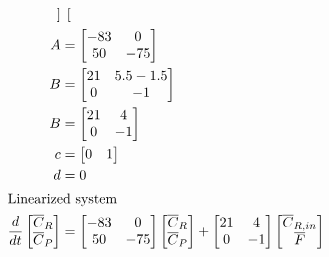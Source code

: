 \documentclass[12pt]{article}
\begin{document}
\begin{enumerate}
\begin{enumerate}
\begin{align*}
\begin{bmatrix}
        \end{bmatrix} \\
        A &= \begin{bmatrix}
            -83 & 0 \\
            50 & -75 \\
        \end{bmatrix} \\
        B &= \begin{bmatrix}
            21 & 5.5 - 1.5 \\
            0 & -1 \\
        \end{bmatrix} \\
        B &= \begin{bmatrix}
            21 & 4 \\
            0 & -1 \\
        \end{bmatrix} \\
        c &= \begin{bmatrix}
            0 & 1 \\
        \end{bmatrix} \\
        d &= 0 \\
        \intertext{Linearized system}
        \frac{d}{dt} \begin{bmatrix}
            \overline{C}_R \\
            \overline{C}_P \\
        \end{bmatrix} &= \begin{bmatrix}
            -83 & 0 \\
            50 & -75 \\
        \end{bmatrix} \begin{bmatrix}
            \overline{C}_R \\
            \overline{C}_P \\
        \end{bmatrix} + \begin{bmatrix}
            21 & 4 \\
            0 & -1 \\
        \end{bmatrix} \begin{bmatrix}
            \overline{C}_{R,in} \\
            \overline{F} \\
        \end{bmatrix} \\

\end{align*}
\end{enumerate}
\end{enumerate}
\end{document}
